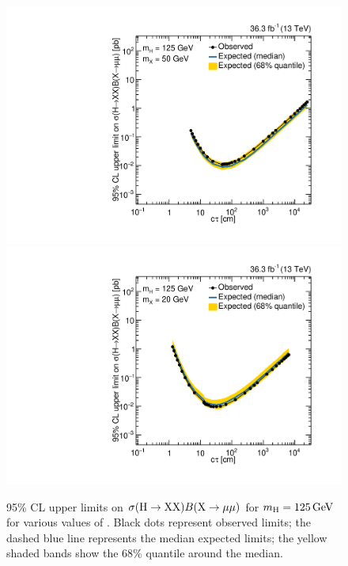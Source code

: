 \begin{figure}[htbp]
  \centering
  \includegraphics[width=\DSquareWidth]{figures/displaced/Limits_2Mu_125_50_HybridNew.pdf}
  \hspace*{-2em}
  \includegraphics[width=\DSquareWidth]{figures/displaced/Limits_2Mu_125_20_HybridNew.pdf}
  \caption[95\% CL upper limits on $\sigma(\PHiggs\to \PLLP\PLLP)B(\PLLP\to\Pgm\Pgm)$ for $\mH = 125\GeV$ for various values of \mX.]{95\% CL upper limits on $\sigma(\PHiggs\to \PLLP\PLLP)B(\PLLP\to\Pgm\Pgm)$ for $\mH = 125\GeV$ for various values of \mX. Black dots represent observed limits; the dashed blue line represents the median expected limits; the yellow shaded bands show the 68\% quantile around the median.}
  \label{fig:dd:UpperLimits_mH_125}
\end{figure}
